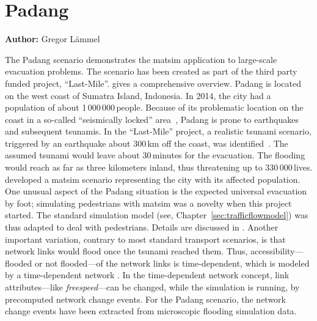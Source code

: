 \chapter{Padang}
\label{ch:padang}
\hfill \textbf{Author:} Gregor Lämmel


The Padang scenario demonstrates the \gls{matsim} application to large-scale evacuation problems. The scenario has been created as part of the third party funded project, ``Last-Mile''. \citet{00TaubenboeckEtAl2012ConcludingLastMilePaperNatHazards} gives a comprehensive overview.
Padang is located on the west coast of Sumatra Island, Indonesia. In 2014, the city had a population of about 1\,000\,000\,people. 
Because of its problematic location on the coast in a so-called ``seismically locked'' area~\citep{McCloskey2010Padang2009Earthquake}, Padang is prone to earthquakes and subsequent tsunamis. In the ``Last-Mile'' project, a realistic tsunami scenario, triggered by an earthquake about 300\,km off the coast, was identified~\citep{GosebergSchlurmann2009HazardMappingPadang}. The assumed tsunami would leave about 30\,minutes for the evacuation. The flooding would reach as far as three kilometers inland, thus threatening up to 330\,000\,lives. \citet{Laemmel_PhDThesis_2011} developed a \gls{matsim} scenario representing the city with its affected population. One unusual aspect of the Padang situation is the expected universal evacuation by foot; simulating pedestrians with \gls{matsim} was a novelty when this project started. The standard simulation model (see, \eg Chapter~\ref{sec:trafficflowmodel}) was thus adapted to deal with pedestrians. 
Details are discussed in \citet{00LaemmelKluepfelNagel2009EvacPadangAtBookTimmermanns}. Another important variation, contrary to most standard transport scenarios, is that network links would flood once the tsunami reached them. Thus, accessibility---flooded or not flooded---of the network links is time-dependent, which is modeled by a time-dependent network \citep{LaemmelGretherNagel2009TimeDependentNetworks}. In the time-dependent network concept, link attributes---like \emph{freespeed}---can be changed, while the simulation is running, by precomputed network change events. For the Padang scenario, the network change events have been extracted from microscopic flooding simulation data.

